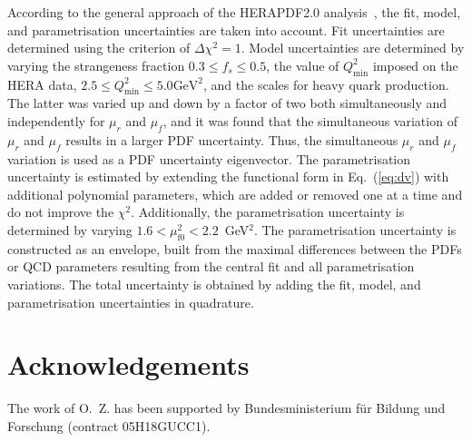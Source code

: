 \documentclass[12pt]{article}
\begin{document}
According to the general approach of the HERAPDF2.0 analysis~\cite{Abramowicz:2015mha}, 
the fit, model, and parametrisation uncertainties are taken into account.
Fit uncertainties are determined using the criterion of $\Delta\chi^2 = 1$.
Model uncertainties are determined by varying the strangeness fraction $0.3 \leq f_{s} \leq 0.5$, the value of $Q^2_{\text{min}}$ imposed on the HERA data, $2.5 \leq Q^2_\textrm{min}\leq 5.0\textrm{GeV}^2$, and the scales for heavy quark production.
The latter was varied up and down by a factor of two both simultaneously and independently for $\mu_r$ and $\mu_f$, and it was found that the simultaneous variation of $\mu_r$ and $\mu_f$ results in a larger PDF uncertainty. Thus, the simultaneous $\mu_r$ and $\mu_f$ variation is used as a PDF uncertainty eigenvector.
The parametrisation uncertainty is estimated by extending the functional form in Eq.~(\ref{eq:dv}) with additional polynomial parameters, which are added or removed one at a time and do not improve the $\chi^2$.
Additionally, the parametrisation uncertainty is determined by varying $1.6 < \mu_\mathrm{f0}^2 < 2.2$~GeV$^2$.
The parametrisation uncertainty is constructed as an envelope, built from the maximal differences between the PDFs or QCD parameters resulting from the central fit and all parametrisation variations.
The total uncertainty is obtained by adding the fit, model, and parametrisation uncertainties in quadrature.


\section*{Acknowledgements}

The work of O.~Z. has been supported by Bundesministerium f\"ur Bildung und Forschung (contract 05H18GUCC1).




\end{document}
